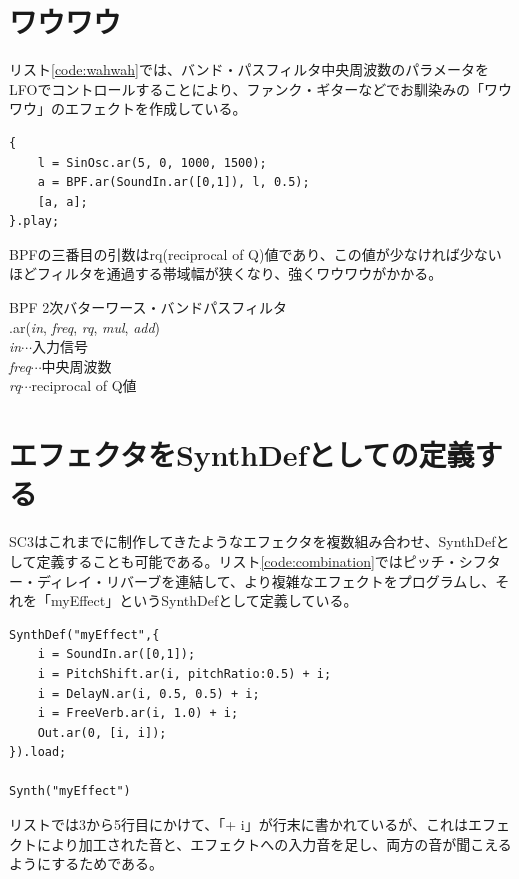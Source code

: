 \documentclass{jsarticle}
\begin{document}
\section{ワウワウ}
リスト\ref{code:wahwah}では、バンド・パスフィルタ中央周波数のパラメータをLFOでコントロールすることにより、ファンク・ギターなどでお馴染みの「ワウワウ」のエフェクトを作成している。
\begin{lstlisting}[caption=ワウワウ, label=code:wahwah]
{
	l = SinOsc.ar(5, 0, 1000, 1500);
	a = BPF.ar(SoundIn.ar([0,1]), l, 0.5);
	[a, a];
}.play;
\end{lstlisting}

BPFの三番目の引数はrq(reciprocal of Q)値であり、この値が少なければ少ないほどフィルタを通過する帯域幅が狭くなり、強くワウワウがかかる。

\begin{itembox}[l]{BPF}
{\footnotesize 
2次バターワース・バンドパスフィルタ\\
.ar({\it in}, {\it freq}, {\it rq}, {\it mul}, {\it add})\\

{\it in}$\cdots$入力信号\\
{\it freq}$\cdots$中央周波数\\
{\it rq}$\cdots$reciprocal of Q値\\
}
\end{itembox}

\section{エフェクタをSynthDefとしての定義する}
SC3はこれまでに制作してきたようなエフェクタを複数組み合わせ、SynthDefとして定義することも可能である。リスト\ref{code:combination}ではピッチ・シフター・ディレイ・リバーブを連結して、より複雑なエフェクトをプログラムし、それを「myEffect」というSynthDefとして定義している。

\begin{lstlisting}[caption=エフェクトの組み合わせ, label=code:combination]
SynthDef("myEffect",{
	i = SoundIn.ar([0,1]);
	i = PitchShift.ar(i, pitchRatio:0.5) + i;
	i = DelayN.ar(i, 0.5, 0.5) + i;
	i = FreeVerb.ar(i, 1.0) + i;
	Out.ar(0, [i, i]);
}).load;

Synth("myEffect")
\end{lstlisting}

リストでは3から5行目にかけて、「+ i」が行末に書かれているが、これはエフェクトにより加工された音と、エフェクトへの入力音を足し、両方の音が聞こえるようにするためである。
\end{document}
